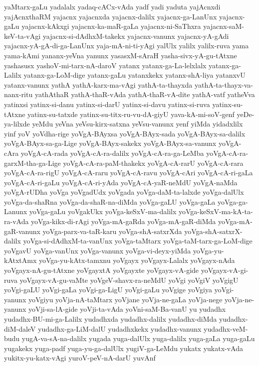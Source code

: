 {yaMtarx-gaLu
yadalalx
yadaq-cACx-vAda
yadf
yadi
yaduta
yajAcnxdi
yajAcnxthaRM
yajacnx
yajacnxda
yajacnx-dalilx
yajacnx-ga-LanUnx
yajacnx-gaLu
yajacnx-kAkxgi
yajacnx-ka-maR-gaLa
yajacnx-ni-SaThxra
yajacnx-saM-keV-ta-vAgi
yajacnx-si-dAdhxM-takekx
yajacnx-vanunx
yajacnx-yA-gAdi
yajacnx-yA-gA-di-ga-LanUnx
yaja-mA-ni-ti-yAgi
yalUlx
yalilx
yalilx-ruva
yama
yama-kAmi
yananx-yeVna
yanunx
yasasxM-sAraH
yasha-sivx-yA-gu-tAtxne
yashasusx
yashoV-mi-tarx-nA-daroV
yatanx
yatanx-ga-La-lelxlalx
yatanx-ga-Lalilx
yatanx-ga-LoM-dige
yatanx-gaLu
yatanxkekx
yatanx-shA-liya
yatanxvU
yatanx-vanunx
yathA
yathA-karx-ma-vAgi
yathA-ta-thayxda
yathA-ta-thayx-va-nanx-ritu
yathAthaR
yathA-thaR-vAda
yathA-thaR-vA-dite
yathA-vatf
yatheVva
yatinxsi
yatinx-si-danu
yatinx-si-darU
yatinx-si-davu
yatinx-si-ruva
yatinx-su-tAtxne
yatinx-su-tatxde
yatinx-su-titx-ru-vu-dA-giyU
yava-kA-mi-soV-genf
yeDe-ya-lilxde
yeMdu
yeVna
yeVsu-kirx-satxna
yeVsu-vanunx
yenf
yiMda
yidadxlilx
yinf
yoV
yoVdha-rige
yoVgA-BAyxsa
yoVgA-BAyx-sada
yoVgA-BAyx-sa-dalilx
yoVgA-BAyx-sa-ga-Lige
yoVgA-BAyx-sakekx
yoVgA-BAyx-sa-vanunx
yoVgA-cAra
yoVgA-cA-rada
yoVgA-cA-ra-dalilx
yoVgA-cA-ra-ga-LeMba
yoVgA-cA-ra-garxM-tha-ga-Lige
yoVgA-cA-ra-paM-thakekx
yoVgA-cA-rarU
yoVgA-cA-rara
yoVgA-cA-ra-rigU
yoVgA-cA-raru
yoVgA-cA-ravu
yoVgA-cAri
yoVgA-cA-ri-gaLa
yoVgA-cA-ri-gaLu
yoVgA-cA-ri-yAda
yoVgA-cA-yaR-neMdU
yoVgA-naMda
yoVgA-rUDha
yoVga
yoVgadUdx
yoVgada
yoVga-daM-ta-lalxde
yoVga-dalUlx
yoVga-da-shaRna
yoVga-da-shaR-na-diMda
yoVga-gaLU
yoVga-gaLa
yoVga-ga-Lanunx
yoVga-gaLu
yoVgakUkx
yoVga-keSxV-ma-dalilx
yoVga-keSxV-ma-kA-ta-ra-vAda
yoVga-kikx-di-rAgi
yoVga-mA-gaRda
yoVga-mA-gaR-diMda
yoVga-mA-gaR-vanunx
yoVga-parx-va-taR-karu
yoVga-shA-satxrXda
yoVga-shA-satxrX-dalilx
yoVga-si-dAdhxM-ta-vanUnx
yoVga-taMtarx
yoVga-taM-tarx-ga-LoM-dige
yoVgavU
yoVga-vanUnx
yoVga-vanunx
yoVga-vi-deyx-yiMda
yoVga-yu-kAtxtAmx
yoVga-yu-kAtx-tamxnu
yoVgayx
yoVgayx-Lalalx
yoVgayx-nAda
yoVgayx-nA-gu-tAtxne
yoVgayxtA
yoVgayxte
yoVgayx-vA-gide
yoVgayx-vA-gi-ruva
yoVgayx-vA-gu-vaMte
yoVgeV-shavx-ra-neMdU
yoVgi
yoVgiV
yoVgigU
yoVgi-gaLU
yoVgi-gaLa
yoVgi-ga-LigU
yoVgi-gaLu
yoVgige
yoVgiya
yoVgi-yanunx
yoVgiyu
yoVja-nA-taMtarx
yoVjane
yoVja-ne-gaLa
yoVja-nege
yoVja-ne-yanunx
yoVji-sa-lA-gide
yoVji-ta-vAda
yoVni-saM-Ba-vanU
yu
yudadhx
yudadhx-BU-mi-ga-Lalilx
yudadhxda
yudadhx-dalilx
yudadhx-diMda
yudadhx-diM-daleV
yudadhx-ga-LiM-dalU
yudadhxkekx
yudadhx-vanunx
yudadhx-veM-budu
yugA-va-sA-na-dalilx
yugada
yuga-dalUlx
yuga-dalilx
yuga-gaLa
yuga-gaLu
yugakekx
yuga-padf
yuga-yu-ga-dalUlx
yugiV-ga-LeMdu
yukatx
yukatx-vAda
yukitx-yu-katx-vAgi
yuroV-peV-nA-darU
yuvAnf
}
